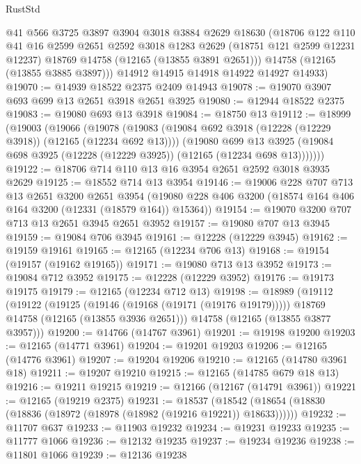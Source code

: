 \begin{lexlean}{RustStd}
\begin{coremodule}
        @41
        @566
        @3725
        @3897
        @3904
        @3018
        @3884
        @2629
        @18630
        (@18706
          @122
          @110
          @41
          @16
          @2599
          @2651
          @2592
          @3018
          @1283
          @2629
          (@18751 @121 @2599 @12231 @12237)
          @18769
          @14758
          (@12165 (@13855 @3891 @2651)))
        @14758
        (@12165 (@13855 @3885 @3897)))
      @14912
      @14915
      @14918
      @14922
      @14927
      @14933)
@19070 := @14939 @18522 @2375 @2409 @14943
@19078 := @19070 @3907 @693 @699 @13 @2651 @3918 @2651 @3925
@19080 := @12944 @18522 @2375
@19083 := @19080 @693 @13 @3918
@19084 := @18750 @13
@19112 := @18999
    (@19003
      (@19066
        (@19078
          (@19083 (@19084 @692 @3918 (@12228 (@12229 @3918)) (@12165 (@12234 @692 @13))))
          (@19080
            @699
            @13
            @3925
            (@19084 @698 @3925 (@12228 (@12229 @3925)) (@12165 (@12234 @698 @13)))))))
@19122 := @18706 @714 @110 @13 @16 @3954 @2651 @2592 @3018 @3935 @2629
@19125 := @18552 @714 @13 @3954
@19146 := @19006
    @228
    @707
    @713
    @13
    @2651
    @3200
    @2651
    @3954
    (@19080 @228 @406 @3200 (@18574 @164 @406 @164 @3200 (@12331 (@18579 @164)) @15364))
@19154 := @19070 @3200 @707 @713 @13 @2651 @3945 @2651 @3952
@19157 := @19080 @707 @13 @3945
@19159 := @19084 @706 @3945
@19161 := @12228 (@12229 @3945)
@19162 := @19159 @19161
@19165 := @12165 (@12234 @706 @13)
@19168 := @19154 (@19157 (@19162 @19165))
@19171 := @19080 @713 @13 @3952
@19173 := @19084 @712 @3952
@19175 := @12228 (@12229 @3952)
@19176 := @19173 @19175
@19179 := @12165 (@12234 @712 @13)
@19198 := @18989
    (@19112
      (@19122
        (@19125 (@19146 (@19168 (@19171 (@19176 @19179)))))
        @18769
        @14758
        (@12165 (@13855 @3936 @2651)))
      @14758
      (@12165 (@13855 @3877 @3957)))
@19200 := @14766 (@14767 @3961)
@19201 := @19198 @19200
@19203 := @12165 (@14771 @3961)
@19204 := @19201 @19203
@19206 := @12165 (@14776 @3961)
@19207 := @19204 @19206
@19210 := @12165 (@14780 @3961 @18)
@19211 := @19207 @19210
@19215 := @12165 (@14785 @679 @18 @13)
@19216 := @19211 @19215
@19219 := @12166 (@12167 (@14791 @3961))
@19221 := @12165 (@19219 @2375)
@19231 := @18537
    (@18542 (@18654 (@18830 (@18836 (@18972 (@18978 (@18982 (@19216 @19221)) @18633))))))
@19232 := @11707 @637
@19233 := @11903 @19232
@19234 := @19231 @19233
@19235 := @11777 @1066
@19236 := @12132 @19235
@19237 := @19234 @19236
@19238 := @11801 @1066
@19239 := @12136 @19238

\end{coremodule}
\end{lexlean}
